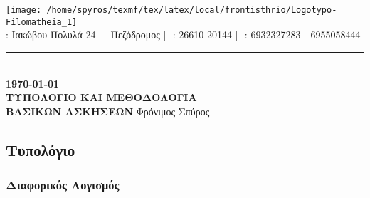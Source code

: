 \documentclass[a4paper,11pt]{article}
\begin{document}
\begin{center}
\texttt{[image: /home/spyros/texmf/tex/latex/local/frontisthrio/Logotypo-Filomatheia\_1]}\\
\vspace{-1mm}
{} : Ιακώβου Πολυλά 24 - \ Πεζόδρομος\,\,|\,\,{} : 26610 20144\,\,|\,\, {} : 6932327283 - 6955058444\\
\rule{14.7cm}{.1mm}\\
\vspace{2mm}
{\bf\today}\\
\vspace*{4cm}
{\huge \textbf{ΤΥΠΟΛΟΓΙΟ ΚΑΙ ΜΕΘΟΔΟΛΟΓΙΑ}\\[3mm]\textbf{ΒΑΣΙΚΩΝ ΑΣΚΗΣΕΩΝ}}
\vspace*{\fill}
\vfil
Φρόνιμος Σπύρος
\end{center}
\newpage
\null
\newpage
{}
\begin{center}
\part{Τυπολόγιο}
\end{center}
\section{Διαφορικός Λογισμός}
\end{document}
